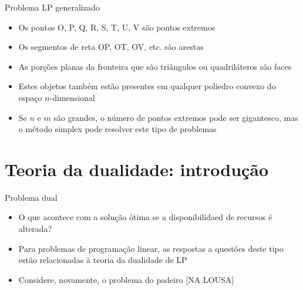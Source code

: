 \documentclass[10pt]{beamer}
\begin{document}
\begin{frame}{Problema LP generalizado}
    \begin{itemize}
        \item Os pontos O, P, Q, R, S, T, U, V são pontos extremos\bigskip
        \item Os segmentos de reta OP, OT, OV, etc. são arestas\bigskip
        \item As porções planas da fronteira que são triângulos ou quadriláteros são faces\bigskip
        \item Estes objetos também estão presentes em qualquer poliedro convexo do espaço $n$-dimensional\bigskip
        \item Se $n$ e $m$ são grandes, o número de pontos extremos pode ser gigantesco, mas o método simplex pode resolver este tipo de problemas
    \end{itemize}    
\end{frame}

\section{Teoria da dualidade: introdução}
\begin{frame}{Problema dual}
    \begin{itemize}
        \item O que acontece com a solução ótima se a disponibilidaed de recursos é alterada?\bigskip
        \item Para problemas de programação linear, as respostas a questões deste tipo estão relacionadas à teoria da dualidade de LP\bigskip
        \item Considere, novamente, o problema do padeiro [NA LOUSA]
    \end{itemize}
\end{frame}
\end{document}
